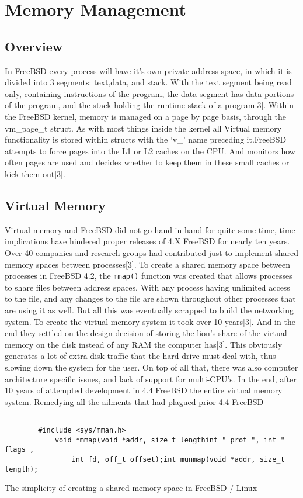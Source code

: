 \documentclass{article}
\begin{document}
\section{Memory Management}
\subsection{Overview}
    In FreeBSD every process will have it’s own private address space, in which it is divided into 3 segments: text,data, and stack. With the text segment being read only, containing instructions of the program, the data segment has data portions of the program, and the stack holding the runtime stack of a program[3]. Within the FreeBSD kernel, memory is managed on a page by page basis, through the vm\_page\_t struct. As with most things inside the kernel all Virtual memory functionality is stored within structs with the ‘v\_’ name preceding it.FreeBSD attempts to force pages into the L1 or L2 caches on the CPU. And monitors how often pages are used and decides whether to keep them in these small caches or kick them out[3].
\subsection{Virtual Memory}
	Virtual memory and FreeBSD did not go hand in hand for quite some time, time implications have hindered proper releases of 4.X FreeBSD for nearly ten years. Over 40 companies and research groups had contributed just to implement shared memory spaces between processes[3]. To create a shared memory space between processes in FreeBSD 4.2, the \texttt{mmap()} function was created that allows processes to share files between address spaces. With any process having unlimited access to the file, and any changes to the file are shown throughout other processes that are using it as well. But all this was eventually scrapped to build the networking system. To create the virtual memory system it took over 10 years[3]. And in the end they settled on the design decision of storing the lion's share of the virtual memory on the disk instead of any RAM the computer has[3]. This obviously generates a lot of extra disk traffic that the hard drive must deal with, thus slowing down the system for the user. On top of all that, there was also computer architecture specific issues, and lack of support for multi-CPU’s. In the end, after 10 years of attempted development in 4.4 FreeBSD the entire virtual memory system. Remedying all the ailments that had plagued  prior 4.4 FreeBSD
	\begin{lstlisting}

		#include <sys/mman.h>
            void *mmap(void *addr, size_t lengthint " prot ", int " flags ,
                int fd, off_t offset);int munmap(void *addr, size_t length);
		\end{lstlisting}
		The simplicity of creating a shared memory space in FreeBSD / Linux
\end{document}
